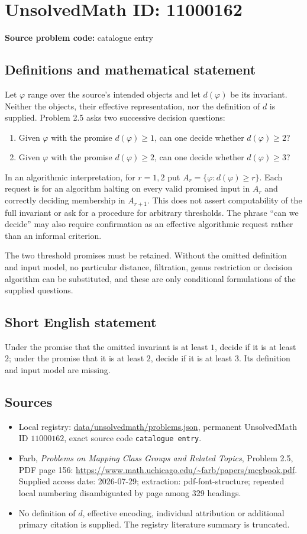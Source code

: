 \documentclass[11pt]{article}
\begin{document}
\section*{UnsolvedMath ID: 11000162}
\textbf{Source problem code:} catalogue entry
\subsection{Definitions and mathematical statement}
Let $\varphi$ range over the source's intended objects and let $d(\varphi)$ be its invariant. Neither the objects, their effective representation, nor the definition of $d$ is supplied. Problem 2.5 asks two successive decision questions:
\begin{enumerate}
\item Given $\varphi$ with the promise $d(\varphi)\geq1$, can one decide whether $d(\varphi)\geq2$?
\item Given $\varphi$ with the promise $d(\varphi)\geq2$, can one decide whether $d(\varphi)\geq3$?
\end{enumerate}
In an algorithmic interpretation, for $r=1,2$ put $A_r=\{\varphi:d(\varphi)\geq r\}$. Each request is for an algorithm halting on every valid promised input in $A_r$ and correctly deciding membership in $A_{r+1}$. This does not assert computability of the full invariant or ask for a procedure for arbitrary thresholds. The phrase ``can we decide'' may also require confirmation as an effective algorithmic request rather than an informal criterion.

The two threshold promises must be retained. Without the omitted definition and input model, no particular distance, filtration, genus restriction or decision algorithm can be substituted, and these are only conditional formulations of the supplied questions.
\subsection{Short English statement}
Under the promise that the omitted invariant is at least $1$, decide if it is at least $2$; under the promise that it is at least $2$, decide if it is at least $3$. Its definition and input model are missing.
\subsection{Sources}
\begin{itemize}
\item Local registry: \url{data/unsolvedmath/problems.json}, permanent UnsolvedMath ID $11000162$, exact source code \texttt{catalogue entry}.
\item Farb, \emph{Problems on Mapping Class Groups and Related Topics}, Problem 2.5, PDF page 156: \url{https://www.math.uchicago.edu/~farb/papers/mcgbook.pdf}. Supplied access date: 2026-07-29; extraction: pdf-font-structure; repeated local numbering disambiguated by page among 329 headings.
\item No definition of $d$, effective encoding, individual attribution or additional primary citation is supplied. The registry literature summary is truncated.
\end{itemize}
\end{document}
